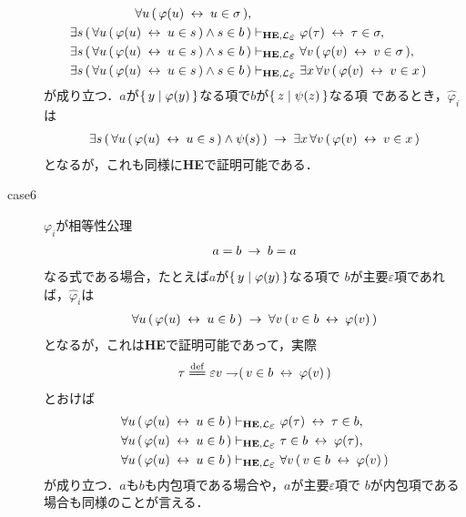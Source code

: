 \begin{metaprf}
\begin{description}
\begin{align}
					\forall u\, (\, \varphi(u) \lrarrow u \in \sigma\, ), \\
					\exists s\, (\, \forall u\, (\, \varphi(u) \lrarrow u \in s\, )
					\wedge s \in b\, )
					&\provable{\mbox{{\bf HE}},\lang{\varepsilon}} \varphi(\tau) \lrarrow \tau \in \sigma, \\
					\exists s\, (\, \forall u\, (\, \varphi(u) \lrarrow u \in s\, )
					\wedge s \in b\, )
					&\provable{\mbox{{\bf HE}},\lang{\varepsilon}} \forall v\, (\, \varphi(v) \lrarrow v \in \sigma\, ), \\
					\exists s\, (\, \forall u\, (\, \varphi(u) \lrarrow u \in s\, )
					\wedge s \in b\, )
					&\provable{\mbox{{\bf HE}},\lang{\varepsilon}} \exists x\, \forall v\, (\, \varphi(v) \lrarrow v \in x\, )
				\end{align}
				が成り立つ．$a$が$\{\, y \mid \varphi(y)\, \}$なる項で$b$が$\{\, z \mid \psi(z)\, \}$なる項
				であるとき，$\widehat{\varphi}_{i}$は
				\begin{align}
					\exists s\, (\, \forall u\, (\, \varphi(u) \hspace{0.25em}\leftrightarrow\hspace{0.25em} u \in s\, )
					\wedge \psi(s)\, ) \hspace{0.25em}\rightarrow\hspace{0.25em} \exists x\, \forall v\, (\, \varphi(v) \hspace{0.25em}\leftrightarrow\hspace{0.25em} v \in x\, )
				\end{align}
				となるが，これも同様に{\bf HE}で証明可能である．
				
			\item[case6] $\varphi_{i}$が相等性公理
				\begin{align}
					a = b \hspace{0.25em}\rightarrow\hspace{0.25em} b = a
				\end{align}
				なる式である場合，たとえば$a$が$\{\, y \mid \varphi(y)\, \}$なる項で
				$b$が主要$\varepsilon$項であれば，$\widehat{\varphi}_{i}$は
				\begin{align}
					\forall u\, (\, \varphi(u) \hspace{0.25em}\leftrightarrow\hspace{0.25em} u \in b\, ) 
					\hspace{0.25em}\rightarrow\hspace{0.25em} \forall v\, (\, v \in b \hspace{0.25em}\leftrightarrow\hspace{0.25em} \varphi(v)\, ) 
				\end{align}
				となるが，これは{\bf HE}で証明可能であって，実際
				\begin{align}
					\tau \defeq \varepsilon v \negation (\, v \in b \lrarrow \varphi(v)\, )
				\end{align}
				とおけば
				\begin{align}
					\forall u\, (\, \varphi(u) \lrarrow u \in b\, ) 
					&\provable{\mbox{{\bf HE}},\lang{\varepsilon}} \varphi(\tau) \lrarrow \tau \in b, \\
					\forall u\, (\, \varphi(u) \lrarrow u \in b\, ) 
					&\provable{\mbox{{\bf HE}},\lang{\varepsilon}} \tau \in b \lrarrow \varphi(\tau), \\
					\forall u\, (\, \varphi(u) \lrarrow u \in b\, ) 
					&\provable{\mbox{{\bf HE}},\lang{\varepsilon}} \forall v\, (\, v \in b \lrarrow \varphi(v)\, )
				\end{align}
				が成り立つ．$a$も$b$も内包項である場合や，$a$が主要$\varepsilon$項で
				$b$が内包項である場合も同様のことが言える．
			

\end{description}
\end{metaprf}
